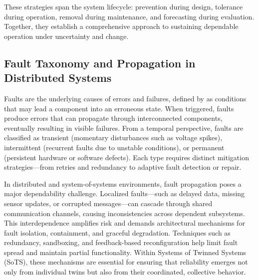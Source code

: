 These strategies span the system lifecycle: prevention during design, tolerance during operation, removal during maintenance, and forecasting during evaluation. Together, they establish a comprehensive approach to sustaining dependable operation under uncertainty and change.


\subsection{Fault Taxonomy and Propagation in Distributed Systems}\label{subsec:background-dependability-faults}

Faults are the underlying causes of errors and failures, defined by \citet{avizienis2004basic} as conditions that may lead a component into an erroneous state. When triggered, faults produce errors that can propagate through interconnected components, eventually resulting in visible failures. From a temporal perspective, faults are classified as transient (momentary disturbances such as voltage spikes), intermittent (recurrent faults due to unstable conditions), or permanent (persistent hardware or software defects). Each type requires distinct mitigation strategies—from retries and redundancy to adaptive fault detection or repair.

In distributed and system-of-systems environments, fault propagation poses a major dependability challenge. Localized faults—such as delayed data, missing sensor updates, or corrupted messages—can cascade through shared communication channels, causing inconsistencies across dependent subsystems. This interdependence amplifies risk and demands architectural mechanisms for fault isolation, containment, and graceful degradation. Techniques such as redundancy, sandboxing, and feedback-based reconfiguration help limit fault spread and maintain partial functionality. Within Systems of Twinned Systems (SoTS), these mechanisms are essential for ensuring that reliability emerges not only from individual twins but also from their coordinated, collective behavior.

